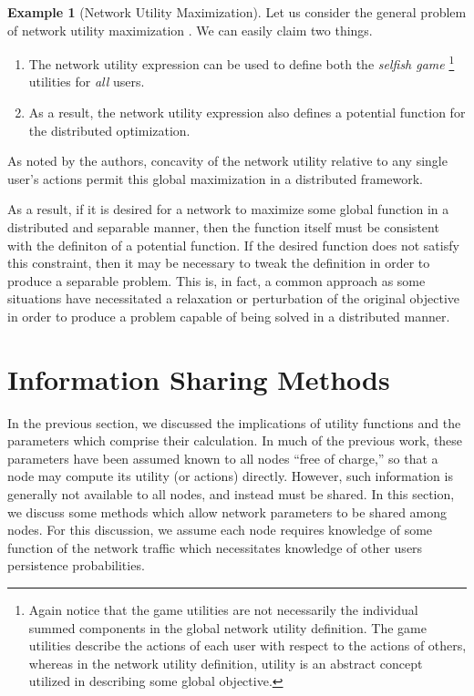 \documentclass[11pt]{IEEEtran}
\theoremstyle{definition}
\newtheorem{example}{Example}
\begin{document}
\begin{example}[Network Utility Maximization]
	Let us consider the general problem of network utility maximization \cite{FB04,LCC07,CLD05,NKGB00,WK03}. We can easily claim two things.
	\begin{enumerate}
		\item The network utility expression can be used to define both the {\em selfish game}
				\footnote{Again notice that the game utilities are not necessarily the individual summed components in the global network utility definition. The game utilities describe the actions of each user with respect to the actions of others, whereas in the network utility definition, utility is an abstract concept utilized in describing some global objective.} 
			 utilities for {\em all} users.
		\item As a result, the network utility expression also defines a potential function for the distributed optimization.
	\end{enumerate}
	As noted by the authors, concavity of the network utility relative to any single user's actions permit this global maximization in a distributed framework.
\end{example}

As a result, if it is desired for a network to maximize some global function in a distributed and separable manner, then the function itself must be consistent with the definiton of a potential function. If the desired function does not satisfy this constraint, then it may be necessary to tweak the definition in order to produce a separable problem. This is, in fact, a common approach as some situations \cite{CLD05} have necessitated a relaxation or perturbation of the original objective in order to produce a problem capable of being solved in a distributed manner.


\section{Information Sharing Methods}

In the previous section, we discussed the implications of utility functions and the parameters which comprise their calculation. In much of the previous work, these parameters have been assumed known to all nodes ``free of charge,'' so that a node may compute its utility (or actions) directly. However, such information is generally not available to all nodes, and instead must be shared. In this section, we discuss some methods which allow network parameters to be shared among nodes. For this discussion, we assume each node requires knowledge of some function of the network traffic which necessitates knowledge of other users persistence probabilities. 
\end{document}
